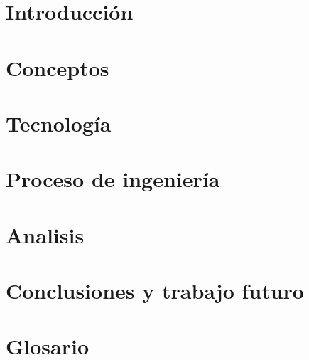 \documentclass[11pt,a4paper,titlepage,twoside,openright]{report}
\begin{document}
\makeatletter
\def\cleardoublepage{\clearpage\if@twoside \ifodd\c@page\else
  \hbox{}\thispagestyle{empty}\newpage\if@twocolumn\hbox{}\newpage\fi\fi\fi}
\makeatother

\tableofcontents


\chapter{Introducción}
        \label{intro}
        
        \cleardoublepage

\chapter{Conceptos}
        \label{concept}
        
        \cleardoublepage

\chapter{Tecnología}
        \label{tec}
        
        \cleardoublepage

\chapter{Proceso de ingeniería}
		\label{ing}
		
		\cleardoublepage

\chapter{Analisis}
		\label{dev}
		
		\cleardoublepage

\chapter{Conclusiones y trabajo futuro}
        \label{conc}
        
        \cleardoublepage

\listoftables
\cleardoublepage

\listoffigures
\cleardoublepage

\appendix
{}

\chapter{Glosario}
		\label{glosario}
		
		\cleardoublepage

\cleardoublepage




\end{document}
